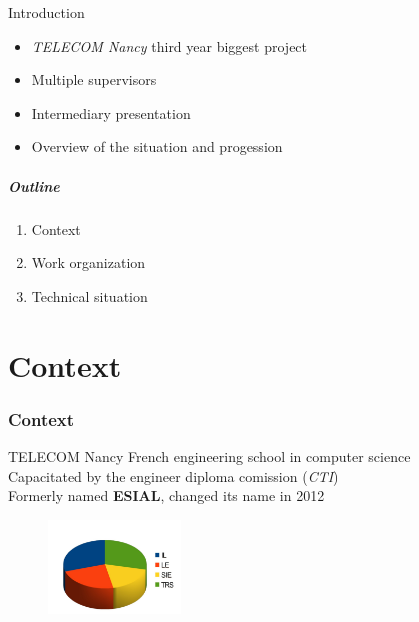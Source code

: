 \documentclass[12pt]{beamer}
\title{\titreA}
\subtitle{\titreB}
\author{Nicolas BOUGET, Julien GUÉPIN, Marc PINHÈDE, Julien VAUBOURG}
\institute{TELECOM Nancy}
\date{December 20, 2012}
\begin{document}
\begin{frame}
\titlepage
\end{frame}

\begin{frame}{Introduction}
    \begin{itemize}
	\item \emph{TELECOM Nancy} third year biggest project
	\vfill
	\item Multiple supervisors
	\vfill
	\item Intermediary presentation
	\vfill
	\item Overview of the situation and progession
    \end{itemize}
\end{frame}

\begin{frame}
    \frametitle{Outline}
    \begin{enumerate}
	\item \large{Context}
	\vfill
	\item \large{Work organization}
	\vfill
	\item \large{Technical situation}
    \end{enumerate}
\end{frame}



    
\part{Context}
\frame{\partpage}
\section{Context}

\begin{frame}{TELECOM Nancy}
    French engineering school in computer science\\
    \vfill
    Capacitated by the engineer diploma comission (\emph{CTI})\\
    \vfill
    Formerly named \textbf{ESIAL}, changed its name in 2012\\
    \vfill
    \begin{figure}
	\includegraphics[width=100pt]{img/promo.jpg}
    \end{figure}
\end{frame}
\end{document}
